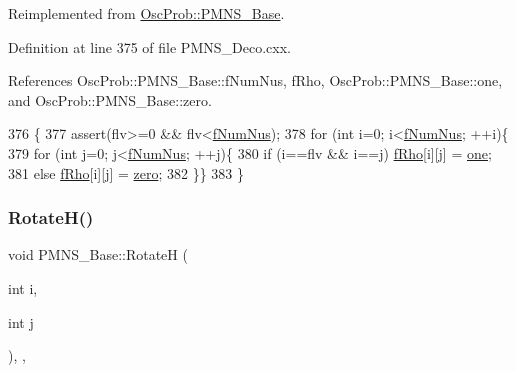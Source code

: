 Reimplemented from \hyperlink{classOscProb_1_1PMNS__Base_ac0d4bf8ff1318ef96d3dafa62e0cec25}{Osc\+Prob\+::\+P\+M\+N\+S\+\_\+\+Base}.



Definition at line 375 of file P\+M\+N\+S\+\_\+\+Deco.\+cxx.



References Osc\+Prob\+::\+P\+M\+N\+S\+\_\+\+Base\+::f\+Num\+Nus, f\+Rho, Osc\+Prob\+::\+P\+M\+N\+S\+\_\+\+Base\+::one, and Osc\+Prob\+::\+P\+M\+N\+S\+\_\+\+Base\+::zero.


\begin{DoxyCode}
376 \{
377   assert(flv>=0 && flv<\hyperlink{classOscProb_1_1PMNS__Base_a24bb74bed63569dfe88b18fa6a08060e}{fNumNus});
378   \textcolor{keywordflow}{for} (\textcolor{keywordtype}{int} i=0; i<\hyperlink{classOscProb_1_1PMNS__Base_a24bb74bed63569dfe88b18fa6a08060e}{fNumNus}; ++i)\{
379   \textcolor{keywordflow}{for} (\textcolor{keywordtype}{int} j=0; j<\hyperlink{classOscProb_1_1PMNS__Base_a24bb74bed63569dfe88b18fa6a08060e}{fNumNus}; ++j)\{
380     \textcolor{keywordflow}{if} (i==flv && i==j) \hyperlink{classOscProb_1_1PMNS__Deco_a0488d62b4ef4cf5b43425769f5fcdbdf}{fRho}[i][j] = \hyperlink{classOscProb_1_1PMNS__Base_ab64aab27448a5aca27565c991a9d173e}{one};
381     \textcolor{keywordflow}{else}                \hyperlink{classOscProb_1_1PMNS__Deco_a0488d62b4ef4cf5b43425769f5fcdbdf}{fRho}[i][j] = \hyperlink{classOscProb_1_1PMNS__Base_a5c31ed4593cf95feb36fb80c1850d25e}{zero};
382   \}\}
383 \}
\end{DoxyCode}
\mbox{\label{classOscProb_1_1PMNS__Base_aae18afd69074211335f49ec40e6011b9}} 
\subsubsection{\texorpdfstring{Rotate\+H()}{RotateH()}}
{\footnotesize\ttfamily void P\+M\+N\+S\+\_\+\+Base\+::\+RotateH (\begin{DoxyParamCaption}\item[{int}]{i,  }\item[{int}]{j }\end{DoxyParamCaption})\hspace{0.3cm}{\ttfamily [protected]}, {\ttfamily [virtual]}, {\ttfamily [inherited]}}

